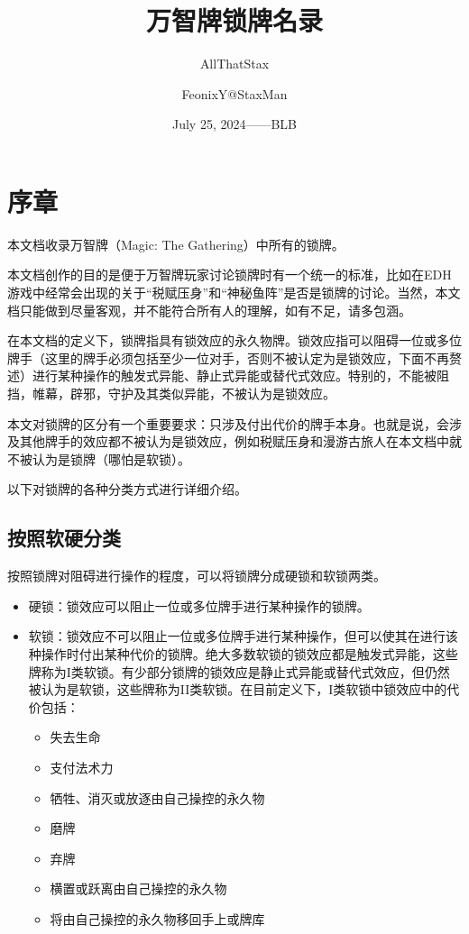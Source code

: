 \documentclass[lang = cn, color = black, 10pt]{AllThatStax}
\title{万智牌锁牌名录}
\subtitle{AllThatStax}
\author{FeonixY@StaxMan}
\date{July 25, 2024——BLB}
\begin{document}
\maketitle
\frontmatter

\chapter*{序章}

本文档收录万智牌（Magic: The Gathering）中所有的锁牌。

本文档创作的目的是便于万智牌玩家讨论锁牌时有一个统一的标准，比如在EDH游戏中经常会出现的关于“税赋压身”和“神秘鱼阵”是否是锁牌的讨论。当然，本文档只能做到尽量客观，并不能符合所有人的理解，如有不足，请多包涵。

在本文档的定义下，锁牌指具有锁效应的永久物牌。锁效应指可以阻碍一位或多位牌手（这里的牌手必须包括至少一位对手，否则不被认定为是锁效应，下面不再赘述）进行某种操作的触发式异能、静止式异能或替代式效应。特别的，不能被阻挡，帷幕，辟邪，守护及其类似异能，不被认为是锁效应。

本文对锁牌的区分有一个重要要求：只涉及付出代价的牌手本身。也就是说，会涉及其他牌手的效应都不被认为是锁效应，例如税赋压身和漫游古旅人在本文档中就不被认为是锁牌（哪怕是软锁）。

以下对锁牌的各种分类方式进行详细介绍。

\section*{按照软硬分类}

按照锁牌对阻碍进行操作的程度，可以将锁牌分成硬锁和软锁两类。

\begin{itemize}
  \item 硬锁：锁效应可以阻止一位或多位牌手进行某种操作的锁牌。
  \item 软锁：锁效应不可以阻止一位或多位牌手进行某种操作，但可以使其在进行该种操作时付出某种代价的锁牌。绝大多数软锁的锁效应都是触发式异能，这些牌称为I类软锁。有少部分锁牌的锁效应是静止式异能或替代式效应，但仍然被认为是软锁，这些牌称为II类软锁。在目前定义下，I类软锁中锁效应中的代价包括：
    \begin{itemize}
        \item 失去生命
        \item 支付法术力
        \item 牺牲、消灭或放逐由自己操控的永久物
        \item 磨牌
        \item 弃牌
        \item 横置或跃离由自己操控的永久物
        \item 将由自己操控的永久物移回手上或牌库
    \end{itemize}
\end{itemize}
\end{document}
